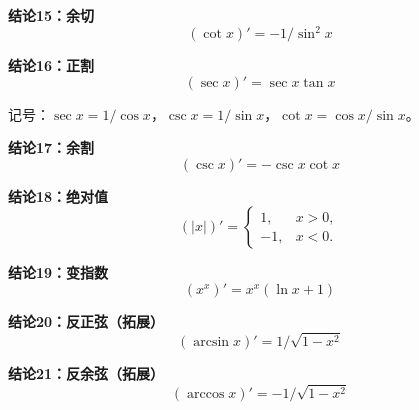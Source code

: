 \begin{statementbox}
\begin{minipage}{\linewidth}
\textbf{结论15：余切}
\[
(\cot x)'=-1/\sin^2x
\]

\end{minipage}
\end{statementbox}

\begin{statementbox}
\begin{minipage}{\linewidth}
\textbf{结论16：正割}
\[
(\sec x)'=\sec x\tan x
\]

\end{minipage}
记号：$\sec x=1/\cos x$，$\csc x=1/\sin x$，$\cot x=\cos x/\sin x$。
\end{statementbox}

\begin{statementbox}
\begin{minipage}{\linewidth}
\textbf{结论17：余割}
\[
(\csc x)'=-\csc x\cot x
\]

\end{minipage}
\end{statementbox}

\begin{statementbox}
\begin{minipage}{\linewidth}
\textbf{结论18：绝对值}
\[
(|x|)'=\begin{cases}1,&x>0,\\-1,&x<0.\end{cases}
\]

\end{minipage}
\end{statementbox}

\begin{statementbox}
\begin{minipage}{\linewidth}
\textbf{结论19：变指数}
\[
(x^x)'=x^x(\ln x+1)
\]

\end{minipage}
\end{statementbox}

\begin{statementbox}
\begin{minipage}{\linewidth}
\textbf{结论20：反正弦（拓展）}
\[
(\arcsin x)'=1/\sqrt{1-x^2}
\]

\end{minipage}
\end{statementbox}

\begin{statementbox}
\begin{minipage}{\linewidth}
\textbf{结论21：反余弦（拓展）}
\[
(\arccos x)'=-1/\sqrt{1-x^2}
\]

\end{minipage}
\end{statementbox}

